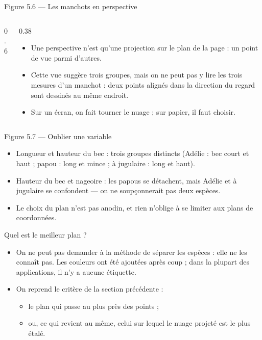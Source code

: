 \begin{frame}{Figure 5.6 --- Les manchots en perspective}
  \begin{columns}[c]
    \begin{column}{0.6\textwidth}
    \end{column}
    \begin{column}{0.38\textwidth}
      \small
      \begin{itemize}
        \item Une perspective n'est qu'une projection sur le plan de la
          page : un point de vue parmi d'autres.
        \item Cette vue suggère trois groupes, mais on ne peut pas y lire
          les trois mesures d'un manchot : deux points alignés dans la
          direction du regard sont dessinés au même endroit.
        \item Sur un écran, on fait tourner le nuage ; sur papier, il faut
          choisir.
      \end{itemize}
    \end{column}
  \end{columns}
\end{frame}

\begin{frame}{Figure 5.7 --- Oublier une variable}
  \small
  \begin{itemize}
    \item Longueur et hauteur du bec : trois groupes distincts (Adélie : bec
      court et haut ; papou : long et mince ; à jugulaire : long et haut).
    \item Hauteur du bec et nageoire : les papous se détachent, mais Adélie
      et à jugulaire se confondent --- on ne soupçonnerait pas deux espèces.
    \item Le choix du plan n'est pas anodin, et rien n'oblige à se limiter
      aux plans de coordonnées.
  \end{itemize}
\end{frame}

\begin{frame}{Quel est le meilleur plan ?}
  \begin{itemize}
    \item On ne peut pas demander à la méthode de séparer les espèces : elle
      ne les connaît pas. Les couleurs ont été ajoutées après coup ; dans la
      plupart des applications, il n'y a aucune étiquette.
    \item On reprend le critère de la section précédente :
      \begin{itemize}
        \item le plan qui passe au plus près des points ;
        \item ou, ce qui revient au même, celui sur lequel le nuage projeté
          est le plus étalé.
      \end{itemize}
  \end{itemize}
\end{frame}

